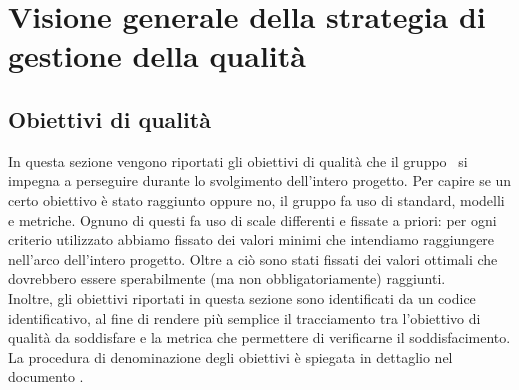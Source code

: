 \documentclass[../PianoDiQualifica.tex]{subfiles}
\begin{document}
\section{Visione generale della strategia di gestione della qualità}
	\subsection{Obiettivi di qualità}
	In questa sezione vengono riportati gli obiettivi di qualità che il gruppo \leaf\ si impegna a perseguire durante lo svolgimento dell'intero progetto. Per capire se un certo obiettivo è stato raggiunto oppure no, il gruppo fa uso di standard, modelli e metriche. Ognuno di questi fa uso di scale differenti e fissate a priori: per ogni criterio utilizzato abbiamo fissato dei valori minimi che intendiamo raggiungere nell'arco dell'intero progetto. Oltre a ciò sono stati fissati dei valori ottimali che dovrebbero essere sperabilmente (ma non obbligatoriamente) raggiunti.\\
	Inoltre, gli obiettivi riportati in questa sezione sono identificati da un codice identificativo, al fine di rendere più semplice il tracciamento tra l'obiettivo di qualità da soddisfare e la metrica che permettere di verificarne il soddisfacimento.\\
	La procedura di denominazione degli obiettivi è spiegata in dettaglio nel documento \normediprogettov.
	
\end{document}
